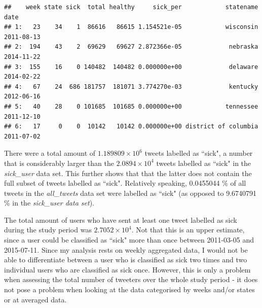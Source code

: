 \documentclass[11pt, a4paper]{report}\usepackage[]{graphicx}\usepackage[]{color}
\makeatletter
\newenvironment{kframe}{%
 \def\at@end@of@kframe{}%
 \ifinner\ifhmode%
  \def\at@end@of@kframe{\end{minipage}}%
  \begin{minipage}{\columnwidth}%
 \fi\fi%
 \def\FrameCommand##1{\hskip\@totalleftmargin \hskip-\fboxsep
 \colorbox{shadecolor}{##1}\hskip-\fboxsep
     \hskip-\linewidth \hskip-\@totalleftmargin \hskip\columnwidth}%
 \MakeFramed {\advance\hsize-\width
   \@totalleftmargin\z@ \linewidth\hsize
   \@setminipage}}%
 {\par\unskip\endMakeFramed%
 \at@end@of@kframe}
\newenvironment{knitrout}{}{} %
\makeatother
\begin{document}
\begin{knitrout}
\color{fgcolor}\begin{kframe}
\begin{verbatim}
##    week state sick  total healthy     sick_per            statename       date
## 1:   23    34    1  86616   86615 1.154521e-05            wisconsin 2011-08-13
## 2:  194    43    2  69629   69627 2.872366e-05             nebraska 2014-11-22
## 3:  155    16    0 140482  140482 0.000000e+00             delaware 2014-02-22
## 4:   67    24  686 181757  181071 3.774270e-03             kentucky 2012-06-16
## 5:   40    28    0 101685  101685 0.000000e+00            tennessee 2011-12-10
## 6:   17     0    0  10142   10142 0.000000e+00 district of columbia 2011-07-02
\end{verbatim}
\end{kframe}
\end{knitrout}

There were a total amount of \ensuremath{1.189809\times 10^{6}} tweets labelled as ``sick", a number that is considerably larger than the \ensuremath{2.0894\times 10^{4}} tweets labelled as ``sick" in the \textit{sick\_user} data set. This further shows that that the latter does not contain the full subset of tweets labelled as ``sick". Relatively speaking, 0.0455044 \% of all tweets in the \textit{all\_tweets} data set were labelled as ``sick" (as opposed to 9.6740791 \% in the \textit{sick\_user data set}).\newline

The total amount of users who have sent at least one tweet labelled as sick during the study period was \ensuremath{2.7052\times 10^{4}}. Not that this is an upper estimate, since a user could be classified as ``sick" more than once between 2011-03-05 and 2015-07-11. Since my analysis rests on weekly aggregated data, I would not be able to differentiate between a user who is classified as sick two times and two individual users who are classified as sick once. However, this is only a problem when assessing the total number of tweeters over the whole study period - it does not pose a problem when looking at the data categorised by weeks and/or states or at averaged data.\newline
\end{document}
